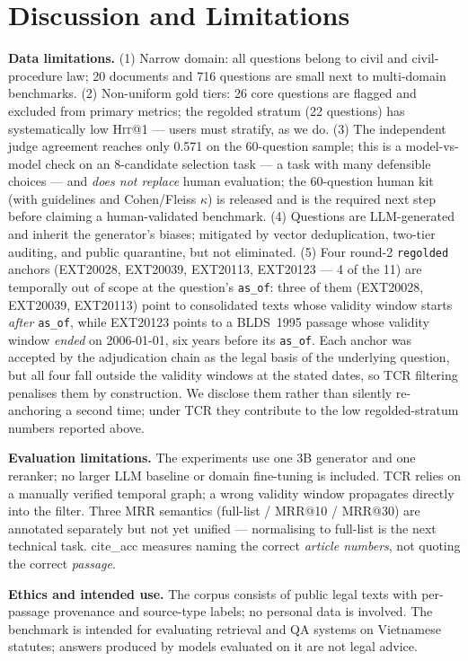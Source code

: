 \documentclass[10pt,a4paper,twocolumn]{article}
\newcommand{\hit}{\textsc{Hit}}
\newcommand{\code}[1]{\texttt{#1}}
\begin{document}
\section{Discussion and Limitations}
\label{sec:limits}

\textbf{Data limitations.} (1) Narrow domain: all questions belong to civil and civil-procedure law; 20 documents and 716 questions are small next to multi-domain benchmarks. (2) Non-uniform gold tiers: 26 core questions are flagged and excluded from primary metrics; the regolded stratum (22 questions) has systematically low \hit{}@1 --- users must stratify, as we do. (3) The independent judge agreement reaches only 0.571 on the 60-question sample; this is a model-vs-model check on an 8-candidate selection task --- a task with many defensible choices --- and \emph{does not replace} human evaluation; the 60-question human kit (with guidelines and Cohen/Fleiss $\kappa$) is released and is the required next step before claiming a human-validated benchmark. (4) Questions are LLM-generated and inherit the generator's biases; mitigated by vector deduplication, two-tier auditing, and public quarantine, but not eliminated. (5) Four round-2 \code{regolded} anchors (EXT20028, EXT20039, EXT20113, EXT20123 --- 4 of the 11) are temporally out of scope at the question's \code{as\_of}: three of them (EXT20028, EXT20039, EXT20113) point to consolidated texts whose validity window starts \emph{after} \code{as\_of}, while EXT20123 points to a BLDS~1995 passage whose validity window \emph{ended} on 2006-01-01, six years before its \code{as\_of}. Each anchor was accepted by the adjudication chain as the legal basis of the underlying question, but all four fall outside the validity windows at the stated dates, so TCR filtering penalises them by construction. We disclose them rather than silently re-anchoring a second time; under TCR they contribute to the low regolded-stratum numbers reported above.

\textbf{Evaluation limitations.} The experiments use one 3B generator and one reranker; no larger LLM baseline or domain fine-tuning is included. TCR relies on a manually verified temporal graph; a wrong validity window propagates directly into the filter. Three MRR semantics (full-list / MRR@10 / MRR@30) are annotated separately but not yet unified --- normalising to full-list is the next technical task. cite\_acc measures naming the correct \emph{article numbers}, not quoting the correct \emph{passage}.

\textbf{Ethics and intended use.} The corpus consists of public legal texts with per-passage provenance and source-type labels; no personal data is involved. The benchmark is intended for evaluating retrieval and QA systems on Vietnamese statutes; answers produced by models evaluated on it are not legal advice.
\end{document}
